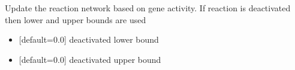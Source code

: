 \documentclass[letterpaper,10pt,english]{sphinxmanual}
\begin{document}
\begin{fulllineitems}
\begin{fulllineitems}
\label{\detokenize{modules_doc:cbmpy.CBModel.Model.updateNetwork}}
\pysigstartsignatures
{}
\pysigstopsignatures
\sphinxAtStartPar
Update the reaction network based on gene activity. If reaction is deactivated then lower and upper bounds are used
\begin{itemize}
\item {} 
\sphinxAtStartPar
{} {[}default=0.0{]} deactivated lower bound

\item {} 
\sphinxAtStartPar
{} {[}default=0.0{]} deactivated upper bound

\end{itemize}

\end{fulllineitems}


\end{fulllineitems}

\end{document}
